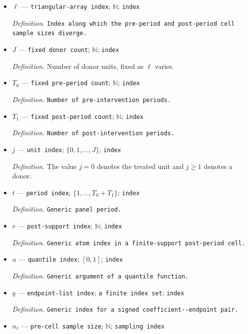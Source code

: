 \documentclass{article}
\begin{document}
\begin{itemize}
  \item \(\ell\) --- \texttt{triangular-\allowbreak{}array index}; \(\mathbb N\); \texttt{index}
  \par\smallskip\noindent\emph{Definition.} \texttt{Index along which the pre-\allowbreak{}period and post-\allowbreak{}period cell sample sizes diverge.}
  \item \(J\) --- \texttt{fixed donor count}; \(\mathbb N\); \texttt{index}
  \par\smallskip\noindent\emph{Definition.} Number of donor units, fixed as \(\ell\) varies.
  \item \(T_0\) --- \texttt{fixed pre-\allowbreak{}period count}; \(\mathbb N\); \texttt{index}
  \par\smallskip\noindent\emph{Definition.} \texttt{Number of pre-\allowbreak{}intervention periods.}
  \item \(T_1\) --- \texttt{fixed post-\allowbreak{}period count}; \(\mathbb N\); \texttt{index}
  \par\smallskip\noindent\emph{Definition.} \texttt{Number of post-\allowbreak{}intervention periods.}
  \item \(j\) --- \texttt{unit index}; \(\{0,1,\ldots,J\}\); \texttt{index}
  \par\smallskip\noindent\emph{Definition.} The value \(j=0\) denotes the treated unit and \(j\geq 1\) denotes a donor.
  \item \(t\) --- \texttt{period index}; \(\{1,\ldots,T_0+T_1\}\); \texttt{index}
  \par\smallskip\noindent\emph{Definition.} \texttt{Generic panel period.}
  \item \(r\) --- \texttt{post-\allowbreak{}support index}; \(\mathbb N\); \texttt{index}
  \par\smallskip\noindent\emph{Definition.} \texttt{Generic atom index in a finite-\allowbreak{}support post-\allowbreak{}period cell.}
  \item \(u\) --- \texttt{quantile index}; \([0,1]\); \texttt{index}
  \par\smallskip\noindent\emph{Definition.} \texttt{Generic argument of a quantile function.}
  \item \(q\) --- \texttt{endpoint-\allowbreak{}list index}; \texttt{a finite index set}; \texttt{index}
  \par\smallskip\noindent\emph{Definition.} \texttt{Generic index for a signed coefficient-\allowbreak{}-\allowbreak{}endpoint pair.}
  \item \(n_\ell\) --- \texttt{pre-\allowbreak{}cell sample size}; \(\mathbb N\); \texttt{sampling index}

\end{itemize}
\end{document}
